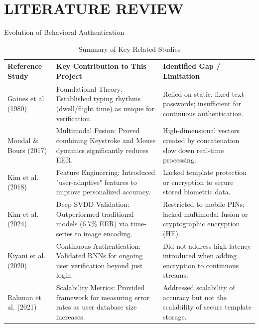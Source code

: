 
\section{LITERATURE REVIEW}

\begin{frame}{Evolution of Behavioral Authentication}
    \begin{table}
        \fontsize{6pt}{7.2pt}\selectfont %
        \centering
        \begin{tabular}{lp{4.8cm}p{4.2cm}}
            \toprule
            \textbf{Reference Study} & \textbf{Key Contribution to This Project} & \textbf{Identified Gap / Limitation} \\
            \midrule
            Gaines et al. (1980) & Foundational Theory: Established typing rhythms (dwell/flight time) as unique for verification. & Relied on static, fixed-text passwords; insufficient for continuous authentication. \\
            \midrule
            Mondal \& Bours (2017) & Multimodal Fusion: Proved combining Keystroke and Mouse dynamics significantly reduces EER. & High-dimensional vectors created by concatenation slow down real-time processing. \\
            \midrule
            Kim et al. (2018) & Feature Engineering: Introduced "user-adaptive" features to improve personalized accuracy. & Lacked template protection or encryption to secure stored biometric data. \\
            \midrule
            Kim et al. (2024) & Deep SVDD Validation: Outperformed traditional models (6.7\% EER) via time-series to image encoding. & Restricted to mobile PINs; lacked multimodal fusion or cryptographic encryption (HE). \\
            \midrule
            Kiyani et al. (2020) & Continuous Authentication: Validated RNNs for ongoing user verification beyond just login. & Did not address high latency introduced when adding encryption to continuous streams. \\
            \midrule
            Rahman et al. (2021) & Scalability Metrics: Provided framework for measuring error rates as user database size increases. & Addressed scalability of accuracy but not the scalability of secure template storage. \\
            \bottomrule
        \end{tabular}
        \caption{Summary of Key Related Studies }
    \end{table}
\end{frame}